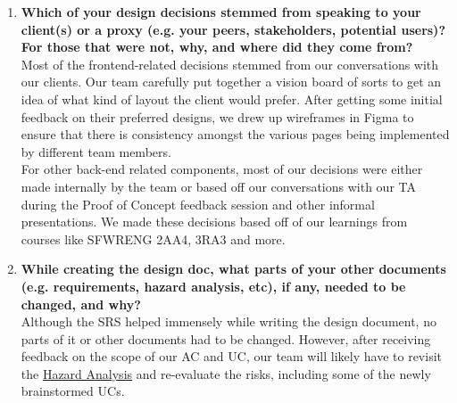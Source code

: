 \documentclass[12pt, titlepage]{article}
\begin{document}
\begin{enumerate}
  \item \textbf{Which of your design decisions stemmed from speaking to your client(s)
  or a proxy (e.g. your peers, stakeholders, potential users)? For those that
  were not, why, and where did they come from?}\\
  \newline
  Most of the frontend-related decisions stemmed from our conversations with our clients. Our team 
  carefully put together a vision board of sorts to get an idea of what kind of layout the client would 
  prefer. After getting some initial feedback on their preferred designs, we drew up wireframes in 
  Figma to ensure that there is consistency amongst the various pages being implemented by different 
  team members.\\
  \newline
  For other back-end related components, most of our decisions were either made internally by the team or 
  based off our conversations with our TA during the Proof of Concept feedback session and other informal 
  presentations. We made these decisions based off of our learnings from courses like SFWRENG 2AA4, 3RA3 and more.

  \item \textbf{While creating the design doc, what parts of your other documents (e.g.
  requirements, hazard analysis, etc), if any, needed to be changed, and why?}\\
  \newline
  Although the SRS helped immensely while writing the design document, no parts of it or other 
  documents had to be changed. However, after receiving feedback on the scope of our AC and UC, our team will 
  likely have to revisit the \href{https://github.com/SumanyaG/Alkalytics/blob/main/docs/HazardAnalysis/HazardAnalysis.pdf}{Hazard Analysis}
  and re-evaluate the risks, including some of the newly brainstormed UCs.


\end{enumerate}
\end{document}

